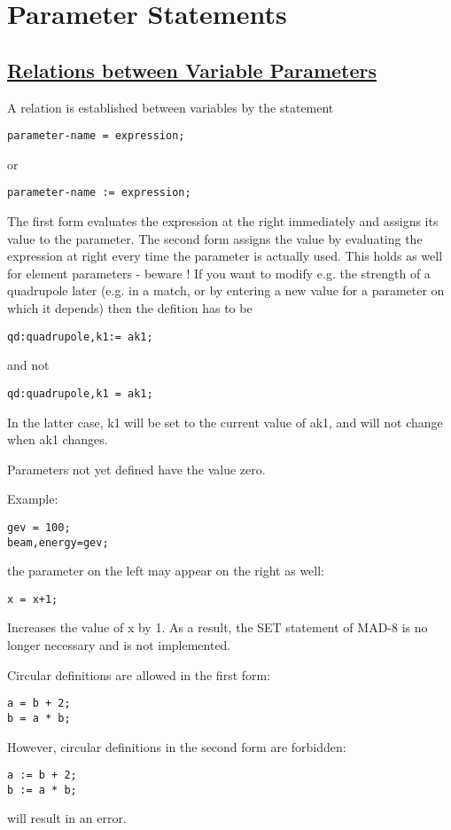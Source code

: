 

\chapter{Parameter Statements}

\section{\href{relation}{Relations between Variable Parameters}}
 A relation is established between variables by the statement 
\begin{verbatim}
parameter-name = expression;
\end{verbatim} 
or 
\begin{verbatim}
parameter-name := expression;
\end{verbatim} 
The first form evaluates the expression at the right immediately and
assigns its value to the parameter. The second form assigns the value by
evaluating  the expression at right every time the parameter is actually
used. This holds as well for element parameters - beware ! If you want
to modify e.g. the strength of a quadrupole later (e.g. in a match,  or
by entering a new value for a parameter on which it depends) then the
defition has to be  
\begin{verbatim}
qd:quadrupole,k1:= ak1;
\end{verbatim} 
and not 
\begin{verbatim}
qd:quadrupole,k1 = ak1;
\end{verbatim} 
In the latter case, k1 will be set to the current value of ak1, and will
not change when ak1 changes.  

Parameters not yet defined have the value zero. 

Example: 
\begin{verbatim}
gev = 100;
beam,energy=gev;
\end{verbatim} 
the parameter on the left may appear on the right as well: 
\begin{verbatim}
x = x+1;
\end{verbatim} 
Increases the value of x by 1. As a result, the SET statement of MAD-8
is no longer necessary and is not implemented.  


Circular definitions are allowed in the first form:
\begin{verbatim}
a = b + 2;
b = a * b;
\end{verbatim}
However, circular definitions in the second form are forbidden:
\begin{verbatim}
a := b + 2;
b := a * b;
\end{verbatim}
will result in an error.


